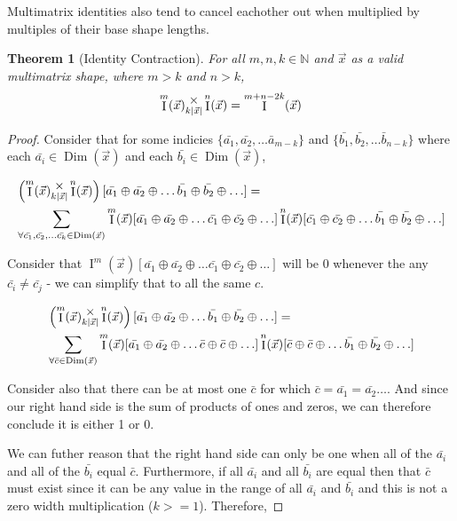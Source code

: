 \documentclass[12pt]{book}
\theoremstyle{plain}
\newtheorem{theorem}{Theorem}[chapter]
\theoremstyle{definition}
\theoremstyle{ppart}
\theoremstyle{case}
\theoremstyle{solution}
\DeclareMathOperator{\Dim}{Dim}
\DeclareMathOperator{\Ident}{I}
\newcommand{\mmult}[1]{\text{\raisebox{1ex}{$\underset{#1}{\times}$}}}
\begin{document}
Multimatrix identities also tend to cancel eachother out when multiplied by
multiples of their base shape lengths.

\begin{landscape}
\begin{theorem}[Identity Contraction]
For all $m, n, k \in \mathbb{N}$ and $\vec{x}$ as a valid multimatrix shape,
where $m > k$ and $n > k$,
\[ \Ident^m(\vec{x}) \mmult{k|\vec{x}|} \Ident^n(\vec{x}) = \Ident^{m+n-2k}(\vec{x}) \]
\end{theorem}
\begin{proof}
Consider that for some indicies
$\{\bar{a_1}, \bar{a_2}, \ldots \bar{a}_{m-k}\}$
and $\{\bar{b_1}, \bar{b_2}, \ldots \bar{b}_{n-k}\}$ where each
$\bar{a_i} \in \Dim(\vec{x})$ and each $\bar{b_i} \in \Dim(\vec{x})$,

\begin{align*}
&\left( \Ident^m(\vec{x}) \mmult{k|\vec{x}|} \Ident^n(\vec{x}) \right)
[\bar{a_1} \oplus \bar{a_2} \oplus \ldots \bar{b_1} \oplus \bar{b_2} \oplus \ldots] = \\
&\sum_{\forall \bar{c_1}, \bar{c_2}, \ldots \bar{c_k} \in \Dim(\vec{x})}
\Ident^m(\vec{x})
[\bar{a_1} \oplus \bar{a_2} \oplus \ldots \bar{c_1} \oplus \bar{c_2} \oplus \ldots]
\Ident^n(\vec{x})
[\bar{c_1} \oplus \bar{c_2} \oplus \ldots \bar{b_1} \oplus \bar{b_2} \oplus \ldots]
\end{align*}

Consider that $\Ident^m(\vec{x})
[\bar{a_1} \oplus \bar{a_2} \oplus \ldots \bar{c_1} \oplus \bar{c_2} \oplus \ldots]$
will be 0 whenever the any $\bar{c_i} \ne \bar{c_j}$ - we can simplify that to all
the same $c$.

\begin{align*}
&\left( \Ident^m(\vec{x}) \mmult{k|\vec{x}|} \Ident^n(\vec{x}) \right)
[\bar{a_1} \oplus \bar{a_2} \oplus \ldots \bar{b_1} \oplus \bar{b_2} \oplus \ldots] = \\
&\sum_{\forall \bar{c} \in \Dim(\vec{x})}
\Ident^m(\vec{x})
[\bar{a_1} \oplus \bar{a_2} \oplus \ldots \bar{c} \oplus \bar{c} \oplus \ldots]
\Ident^n(\vec{x})
[\bar{c} \oplus \bar{c} \oplus \ldots \bar{b_1} \oplus \bar{b_2} \oplus \ldots]
\end{align*}

Consider also that there can be at most one $\bar{c}$ for which
$\bar{c} = \bar{a_1} = \bar{a_2} \ldots$. And since our right hand side is
the sum of products of ones and zeros, we can therefore conclude it is either 1 or 0.

We can futher reason that the right hand side can only be one when all of the
$\bar{a_i}$ and all of the $\bar{b_i}$ equal $\bar{c}$. Furthermore, if all
$\bar{a_i}$ and all $\bar{b_i}$ are equal then that $\bar{c}$ must exist since it can
be any value in the range of all $\bar{a_i}$ and $\bar{b_i}$ and this is not a
zero width multiplication ($k >= 1$). Therefore,


\end{proof}
\end{landscape}
\end{document}
